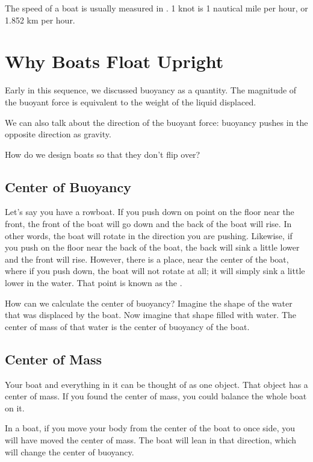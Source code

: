 The speed of a boat is usually measured in . 1 knot is 1 nautical mile per hour, or 1.852 km per hour.

\section{Why Boats Float Upright}

Early in this sequence, we discussed buoyancy as a quantity. The magnitude of the buoyant force is equivalent to the weight of the liquid displaced.

We can also talk about the direction of the buoyant force: buoyancy pushes in the opposite direction as gravity.

How do we design boats so that they don't flip over?

\subsection{Center of Buoyancy}

Let's say you have a rowboat. If you push down on point on the floor near the front, the front of the boat will go down and the back of the boat will rise. In other words, the boat will rotate in the direction you are pushing. 
Likewise, if you push on the floor near the back of the boat, the back will sink a little lower and the front will rise. However, there is a place, near the center of the boat, where if you push down, the boat will not rotate at all; it will simply sink a little lower
in the water. That point is known as the .


How can we calculate the center of buoyancy?  Imagine the shape of the water that was displaced by the boat. Now imagine that shape filled with water. The center of mass of that water is the center of buoyancy of the boat.

\subsection{Center of Mass}

Your boat and everything in it can be thought of as one object.  That object has a center of mass. If you found the center of mass, you could balance the whole boat on it.

In a boat,  if you move your body from the center of the boat to once side, you will have moved the center of mass. The boat will lean in that direction, which will change the center of buoyancy. 

